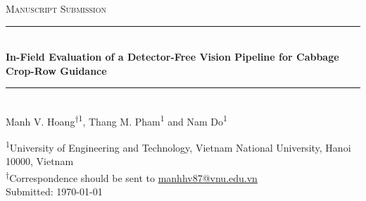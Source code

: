 
\begin{titlepage}

  \newcommand{\HRule}{\rule{\linewidth}{0.5mm}} %

  \center %



  \textsc{\Large Manuscript Submission}\\[0.5cm] %


  \vspace{1.5 cm}
  \HRule \\[0.4cm]
  { \huge \bfseries In-Field Evaluation of a Detector-Free Vision Pipeline for Cabbage Crop-Row Guidance} %
  \HRule \\[1.5cm]


  Manh V. Hoang\textsuperscript{$\dagger$1}, Thang M. Pham\textsuperscript{1} and Nam Do\textsuperscript{1}
  \vspace{1cm}


  \textsuperscript{1}University of Engineering and Technology, Vietnam National University, Hanoi 10000, Vietnam \\

  \textsuperscript{$\dagger$}Correspondence should be sent to \href{mailto:manhhv87@vnu.edu.vn}{manhhv87@vnu.edu.vn} \\

  \vspace{1.5 cm}
  {\large Submitted: \today}\\[3cm] %

  \vfill %

\end{titlepage}


\newpage